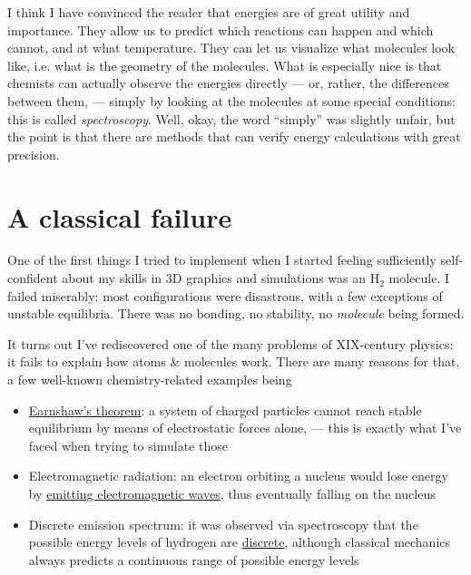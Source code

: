\documentclass{article}
\newcommand{\molecule}[1]{\textrm{#1}}
\begin{document}
I think I have convinced the reader that energies are of great utility and importance. They allow us to predict which reactions can happen and which cannot, and at what temperature. They can let us visualize what molecules look like, i.e. what is the geometry of the molecules. What is especially nice is that chemists can actually observe the energies directly --- or, rather, the differences between them, --- simply by looking at the molecules at some special conditions: this is called \textit{spectroscopy}. Well, okay, the word ``simply'' was slightly unfair, but the point is that there are methods that can verify energy calculations with great precision.

\newpage

\section{A classical failure}

One of the first things I tried to implement when I started feeling sufficiently self-confident about my skills in 3D graphics and simulations was an \(\molecule{H}_2\) molecule. I failed miserably: most configurations were disastrous, with a few exceptions of unstable equilibria. There was no bonding, no stability, no \textit{molecule} being formed.

It turns out I've rediscovered one of the many problems of XIX-century physics: it fails to explain how atoms \& molecules work. There are many reasons for that, a few well-known chemistry-related examples being

\begin{itemize}
\item \href{https://en.wikipedia.org/wiki/Earnshaw's_theorem}{Earnshaw's theorem}: a system of charged particles cannot reach stable equilibrium by means of electrostatic forces alone, --- this is exactly what I've faced when trying to simulate those
\item Electromagnetic radiation: an electron orbiting a nucleus would lose energy by \href{https://en.wikipedia.org/wiki/Larmor_formula}{emitting electromagnetic waves}, thus eventually falling on the nucleus
\item Discrete emission spectrum: it was observed via spectroscopy that the possible energy levels of hydrogen are \href{https://en.wikipedia.org/wiki/Hydrogen_spectral_series}{discrete}, although classical mechanics always predicts a continuous range of possible energy levels
\end{itemize}
\end{document}
